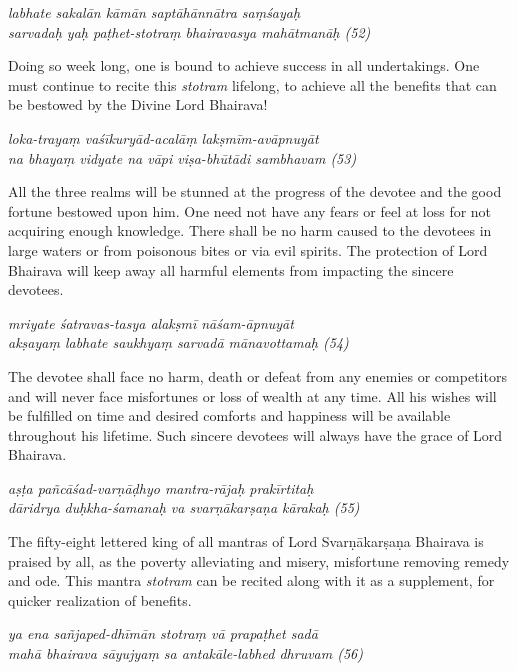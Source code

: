 \documentclass[11pt,oneside,a4paper]{article}
\newenvironment{shloka}[1]
  {\bigskip\center#1\varwidth{\linewidth}}
  {\endvarwidth\endcenter\bigskip}
\newcommand{\tl}[1]{\emph{#1}}
\begin{document}
\begin{shloka}\itshape
  labhate sakalān kāmān saptāhānnātra saṃśayaḥ\\
  sarvadaḥ yaḥ paṭhet-stotraṃ bhairavasya mahātmanāḥ (52)
\end{shloka}

Doing so week long, one is bound to achieve success in all undertakings. One
must continue to recite this \tl{stotram} lifelong, to achieve all the benefits
that can be bestowed by the Divine Lord Bhairava!

\begin{shloka}\itshape
  loka-trayaṃ vaśīkuryād-acalāṃ lakṣmīm-avāpnuyāt\\
  na bhayaṃ vidyate na vāpi viṣa-bhūtādi sambhavam (53)
\end{shloka}

All the three realms will be stunned at the progress of the devotee and the good
fortune bestowed upon him. One need not have any fears or feel at loss for not
acquiring enough knowledge. There shall be no harm caused to the devotees in
large waters or from poisonous bites or via evil spirits. The protection of Lord
Bhairava will keep away all harmful elements from impacting the sincere
devotees.

\begin{shloka}\itshape
  mriyate śatravas-tasya alakṣmī nāśam-āpnuyāt\\
  akṣayaṃ labhate saukhyaṃ sarvadā mānavottamaḥ (54)
\end{shloka}

The devotee shall face no harm, death or defeat from any enemies or competitors
and will never face misfortunes or loss of wealth at any time. All his wishes
will be fulfilled on time and desired comforts and happiness will be available
throughout his lifetime. Such sincere devotees will always have the grace of
Lord Bhairava.

\begin{shloka}\itshape
  aṣṭa pañcāśad-varṇāḍhyo mantra-rājaḥ prakīrtitaḥ\\
  dāridrya duḥkha-śamanaḥ va svarṇākarṣaṇa kārakaḥ (55)
\end{shloka}

The fifty-eight lettered king of all mantras of Lord Svarṇākarṣaṇa Bhairava is
praised by all, as the poverty alleviating and misery, misfortune removing
remedy and ode. This mantra \tl{stotram} can be recited along with it as
a supplement, for quicker realization of benefits.

\begin{shloka}\itshape
  ya ena sañjaped-dhīmān stotraṃ vā prapaṭhet sadā\\
  mahā bhairava sāyujyaṃ sa antakāle-labhed dhruvam (56)
\end{shloka}
\end{document}
